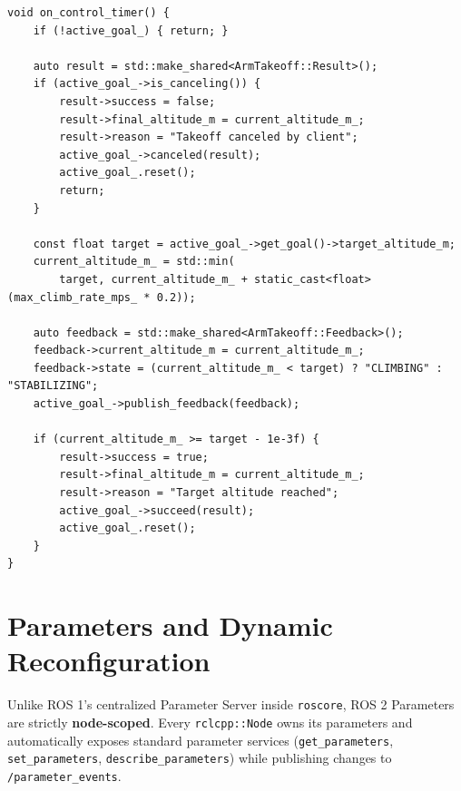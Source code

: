 \documentclass{article}
\begin{document}
\begin{verbatim}
void on_control_timer() {
    if (!active_goal_) { return; }

    auto result = std::make_shared<ArmTakeoff::Result>();
    if (active_goal_->is_canceling()) {
        result->success = false;
        result->final_altitude_m = current_altitude_m_;
        result->reason = "Takeoff canceled by client";
        active_goal_->canceled(result);
        active_goal_.reset();
        return;
    }

    const float target = active_goal_->get_goal()->target_altitude_m;
    current_altitude_m_ = std::min(
        target, current_altitude_m_ + static_cast<float>(max_climb_rate_mps_ * 0.2));

    auto feedback = std::make_shared<ArmTakeoff::Feedback>();
    feedback->current_altitude_m = current_altitude_m_;
    feedback->state = (current_altitude_m_ < target) ? "CLIMBING" : "STABILIZING";
    active_goal_->publish_feedback(feedback);

    if (current_altitude_m_ >= target - 1e-3f) {
        result->success = true;
        result->final_altitude_m = current_altitude_m_;
        result->reason = "Target altitude reached";
        active_goal_->succeed(result);
        active_goal_.reset();
    }
}
\end{verbatim}

\section{Parameters and Dynamic Reconfiguration}
Unlike ROS 1's centralized Parameter Server inside \texttt{roscore}, ROS 2 Parameters are strictly \textbf{node-scoped}. Every \texttt{rclcpp::Node} owns its parameters and automatically exposes standard parameter services (\texttt{get\_parameters}, \texttt{set\_parameters}, \texttt{describe\_parameters}) while publishing changes to \texttt{/parameter\_events}.
\end{document}
